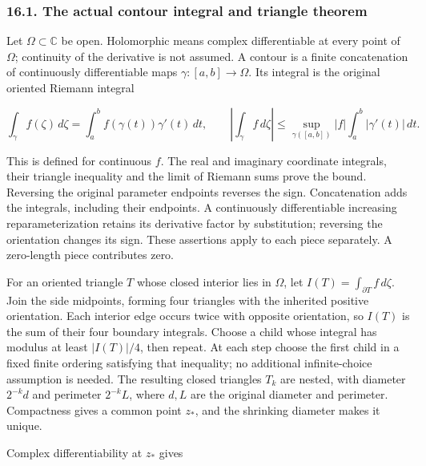 \documentclass[
  11pt,
]{article}
\makeatletter
\let\ReaderOriginalAnchorStart\hyper@anchorstart
\let\ReaderOriginalAnchorEnd\hyper@anchorend
\let\ReaderPendingAliases\@empty
\def\ReaderArmAliases#1{\gdef\ReaderPendingAliases{#1}}
\def\hyper@anchorstart#1{\ReaderIfNativeAnchorTF{#1}{\ReaderPendingAliases\global\let\ReaderPendingAliases\@empty}{}\ReaderOriginalAnchorStart{#1}}
\makeatother
\begin{document}
\ReaderArmAliases{\ReaderOriginalAnchorStart{AN03-CN-COMPLEX-001}\ReaderOriginalAnchorEnd\begingroup\expandafter\def\csname @currentHref\endcsname{AN03-CN-COMPLEX-001}\label{AN03-CN-COMPLEX-001}\endgroup\ReaderOriginalAnchorStart{the-actual-contour-integral-and-triangle-theorem}\ReaderOriginalAnchorEnd}
\subsubsection{16.1. The actual contour integral and triangle
theorem}\label{the-actual-contour-integral-and-triangle-theorem}

Let \(\Omega\subset\mathbb C\) be open. Holomorphic means complex
differentiable at every point of \(\Omega\); continuity of the
derivative is not assumed. A contour is a finite concatenation of
continuously differentiable maps \(\gamma:[a,b]\to\Omega\). Its integral
is the original oriented Riemann integral

\[
\int_\gamma f(\zeta)\,d\zeta
 =\int_a^b f(\gamma(t))\gamma'(t)\,dt,\qquad
\left|\int_\gamma f\,d\zeta\right|
 \leq \sup_{\gamma([a,b])}|f|\int_a^b|\gamma'(t)|\,dt.
\tag{CX1}
\]

This is defined for continuous \(f\). The real and imaginary coordinate
integrals, their triangle inequality and the limit of Riemann sums prove
the bound. Reversing the original parameter endpoints reverses the sign.
Concatenation adds the integrals, including their endpoints. A
continuously differentiable increasing reparameterization retains its
derivative factor by substitution; reversing the orientation changes its
sign. These assertions apply to each piece separately. A zero-length
piece contributes zero.

For an oriented triangle \(T\) whose closed interior lies in \(\Omega\),
let \(I(T)=\int_{\partial T}f\,d\zeta\). Join the side midpoints,
forming four triangles with the inherited positive orientation. Each
interior edge occurs twice with opposite orientation, so \(I(T)\) is the
sum of their four boundary integrals. Choose a child whose integral has
modulus at least \(|I(T)|/4\), then repeat. At each step choose the
first child in a fixed finite ordering satisfying that inequality; no
additional infinite-choice assumption is needed. The resulting closed
triangles \(T_k\) are nested, with diameter \(2^{-k}d\) and perimeter
\(2^{-k}L\), where \(d,L\) are the original diameter and perimeter.
Compactness gives a common point \(z_*\), and the shrinking diameter
makes it unique.

Complex differentiability at \(z_*\) gives
\end{document}

